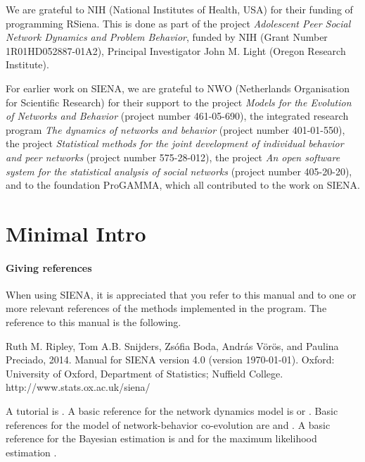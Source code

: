 \documentclass[a4paper,fleqn,11pt]{article}
\newcommand{\+}{\, + \,}
\newcommand{\rs}{{\sf RSiena}}
\newcommand{\si}{{\sf SIENA}}
\begin{document}

We are grateful to NIH (National Institutes of Health, USA)
for their funding of programming \rs.
This is done
as part of the project \emph{Adolescent Peer Social Network Dynamics
and Problem Behavior}, funded by NIH (Grant Number 1R01HD052887-01A2),
Principal Investigator John M. Light (Oregon Research Institute).

For earlier work on \si, we are grateful to NWO (Netherlands Organisation for
Scientific Research) for their support to the project
\emph{Models for the Evolution of Networks and Behavior}
(project number 461-05-690),
the integrated research program
\emph{The dynamics of networks and behavior} (project number 401-01-550),
the project \emph{Statistical methods for the joint development of
individual behavior and peer networks} (project number 575-28-012),
the project \emph{An open software system for the statistical
analysis of social networks} (project number 405-20-20),
and to the foundation ProGAMMA,
which all contributed to the work on \si.

\newpage
\part{Minimal Intro}



\subsection{Giving references}

When using \si, it is appreciated that you refer to this manual and to one or
more relevant references of the methods implemented in the program.  The
reference to this manual is the following.  \smallskip

\noindent
Ruth M. Ripley, Tom A.B. Snijders, Zs\'{o}fia Boda,
 Andr\'{a}s V\"{o}r\"{o}s, and Paulina Preciado, 2014.
Manual for SIENA version 4.0 (version \today).
Oxford: University of Oxford, Department of Statistics; Nuffield College.
\textsf{http://www.stats.ox.ac.uk/siena/}

\smallskip


A tutorial is \citet*{SnijdersEA10b}.
A basic reference for the network dynamics model is \citet{Snijders01}
or \citet{Snijders05}.
Basic references for the model of network-behavior co-evolution
are \citet*{SnijdersEA07} and \citet*{SteglichEA10}.
A basic reference for the Bayesian estimation is \citet{KoskinenSnijders07}
and for the maximum likelihood estimation \citet*{SnijdersEA10a}.
\end{document}
